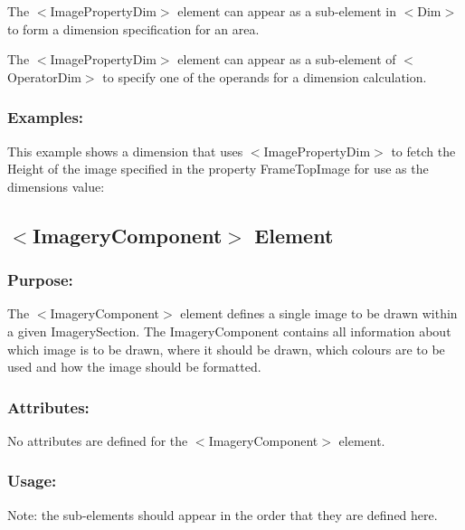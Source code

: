\begin{DoxyItemize}
\item The {\ttfamily $<$Image\+Property\+Dim$>$} element can appear as a sub-\/element in {\ttfamily $<$Dim$>$} to form a dimension specification for an area. 
\item The {\ttfamily $<$Image\+Property\+Dim$>$} element can appear as a sub-\/element of {\ttfamily $<$Operator\+Dim$>$} to specify one of the operands for a dimension calculation. 
\end{DoxyItemize}\hypertarget{fal_element_ref_fal_elem_ref_sec_imagepropertydim_4}{}\subsubsection{Examples\+:}\label{fal_element_ref_fal_elem_ref_sec_imagepropertydim_4}
This example shows a dimension that uses {\ttfamily $<$Image\+Property\+Dim$>$} to fetch the Height of the image specified in the property {\ttfamily Frame\+Top\+Image} for use as the dimension\textquotesingle{}s value\+: 
\begin{DoxyCode}{0}
\end{DoxyCode}
\hypertarget{fal_element_ref_fal_elem_ref_sec_20}{}\subsection{$<$\+Imagery\+Component$>$ Element}\label{fal_element_ref_fal_elem_ref_sec_20}
\hypertarget{fal_element_ref_fal_elem_ref_sec_20_1}{}\subsubsection{Purpose\+:}\label{fal_element_ref_fal_elem_ref_sec_20_1}
The {\ttfamily $<$Imagery\+Component$>$} element defines a single image to be drawn within a given Imagery\+Section. The Imagery\+Component contains all information about which image is to be drawn, where it should be drawn, which colours are to be used and how the image should be formatted.\hypertarget{fal_element_ref_fal_elem_ref_sec_20_2}{}\subsubsection{Attributes\+:}\label{fal_element_ref_fal_elem_ref_sec_20_2}
No attributes are defined for the {\ttfamily $<$Imagery\+Component$>$} element.\hypertarget{fal_element_ref_fal_elem_ref_sec_20_3}{}\subsubsection{Usage\+:}\label{fal_element_ref_fal_elem_ref_sec_20_3}
Note\+: the sub-\/elements should appear in the order that they are defined here.



